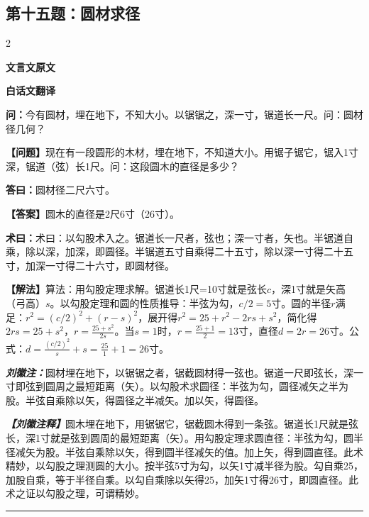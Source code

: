 \documentclass[10pt,a4paper]{article}
\newcommand{\wen}[1]{\textbf{\color{problemcolor}问：}#1\par}
\newcommand{\da}[1]{\textbf{答曰：}#1\par}
\newcommand{\shu}[1]{\textbf{术曰：}#1\par}
\newcommand{\liuhui}[1]{{\color{commentarycolor}\textit{\textbf{刘徽注：}}#1\par}}
\newcommand{\classicalheader}[1]{{\centering\large\bfseries\color{classicalcolor} #1\par\vspace{0.5em}}}
\newcommand{\wenmodern}[1]{\textbf{\color{moderncolor}【问题】}#1\par}
\newcommand{\damodern}[1]{\textbf{【答案】}#1\par}
\newcommand{\shumodern}[1]{\textbf{【解法】}#1\par}
\newcommand{\liuhuimodern}[1]{{\color{commentarycolor}\textit{\textbf{【刘徽注释】}}#1\par}}
\newcommand{\modernheader}[1]{{\centering\large\bfseries\color{moderncolor} #1\par\vspace{0.5em}}}
\newcommand{\problemsec}[1]{\subsection*{#1}}
\begin{document}
\problemsec{第十五题：圆材求径}
\begin{paracol}{2}
\classicalheader{文言文原文}
\switchcolumn
\modernheader{白话文翻译}
\switchcolumn*

\wen{今有圆材，埋在地下，不知大小。以锯锯之，深一寸，锯道长一尺。问：圆材径几何？}

\switchcolumn

\wenmodern{现在有一段圆形的木材，埋在地下，不知道大小。用锯子锯它，锯入1寸深，锯道（弦）长1尺。问：这段圆木的直径是多少？}

\switchcolumn*

\da{圆材径二尺六寸。}

\switchcolumn

\damodern{圆木的直径是2尺6寸（26寸）。}

\switchcolumn*

\shu{术曰：以勾股术入之。锯道长一尺者，弦也；深一寸者，矢也。半锯道自乘，除以深，加深，即圆径。半锯道五寸自乘得二十五寸，除以深一寸得二十五寸，加深一寸得二十六寸，即圆材径。}

\switchcolumn

\shumodern{算法：用勾股定理求解。锯道长1尺=10寸就是弦长$c$，深1寸就是矢高（弓高）$s$。以勾股定理和圆的性质推导：半弦为勾，$c/2=5$寸。圆的半径$r$满足：$r^2=(c/2)^2+(r-s)^2$，展开得$r^2=25+r^2-2rs+s^2$，简化得$2rs=25+s^2$，$r=\frac{25+s^2}{2s}$。当$s=1$时，$r=\frac{25+1}{2}=13$寸，直径$d=2r=26$寸。公式：$d=\frac{(c/2)^2}{s}+s=\frac{25}{1}+1=26$寸。}

\switchcolumn*

\liuhui{圆材埋在地下，以锯锯之者，锯截圆材得一弦也。锯道一尺即弦长，深一寸即弦到圆周之最短距离（矢）。以勾股术求圆径：半弦为勾，圆径减矢之半为股。半弦自乘除以矢，得圆径之半减矢。加以矢，得圆径。}

\switchcolumn

\liuhuimodern{圆木埋在地下，用锯锯它，锯截圆木得到一条弦。锯道长1尺就是弦长，深1寸就是弦到圆周的最短距离（矢）。用勾股定理求圆直径：半弦为勾，圆半径减矢为股。半弦自乘除以矢，得到圆半径减矢的值。加上矢，得到圆直径。此术精妙，以勾股之理测圆的大小。按半弦5寸为勾，以矢1寸减半径为股。勾自乘25，加股自乘，等于半径自乘。以勾自乘除以矢得25，加矢1寸得26寸，即圆直径。此术之证以勾股之理，可谓精妙。}

\end{paracol}

\vspace{0.3cm}
\hrule
\vspace{0.3cm}
\end{document}
